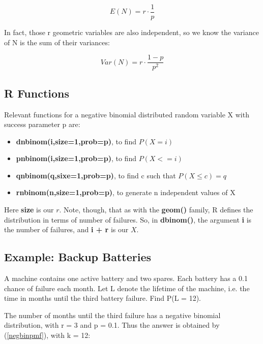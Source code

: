 \begin{equation}
E(N) = r \cdot \frac{1}{p}
\end{equation}

In fact, those r geometric variables are also independent, so we know
the variance of N is the sum of their variances:

\begin{equation}
Var(N) = r \cdot \frac{1-p}{p^2}
\end{equation} 

\subsection{R Functions}

Relevant functions for a negative binomial distributed random variable X
with success parameter p are:

\begin{itemize}

\item {\bf dnbinom(i,size=1,prob=p)}, to find $P(X = i)$

\item {\bf pnbinom(i,size=1,prob=p)}, to find $P(X <= i)$

\item {\bf qnbinom(q,sixe=1,prob=p)}, to find c such that $P(X \leq c) = q$

\item {\bf rnbinom(n,size=1,prob=p)}, to generate n independent values of X

\end{itemize}

Here {\bf size} is our $r$.  Note, though, that as with the {\bf geom()}
family, R defines the distribution in terms of number of failures.  So,
in {\bf dbinom()}, the argument {\bf i} is the number of failures, and
{\bf i + r} is our $X$.

\subsection{Example:  Backup Batteries}

A machine contains one active battery and two spares.  Each
battery has a 0.1 chance of failure each month.  Let L denote the
lifetime of the machine, i.e. the time in months until the third battery
failure.  Find P(L = 12).

The number of months until the third failure has a negative
binomial distribution, with r = 3 and p = 0.1.  Thus the answer is
obtained by (\ref{negbinpmf}), with k = 12:

